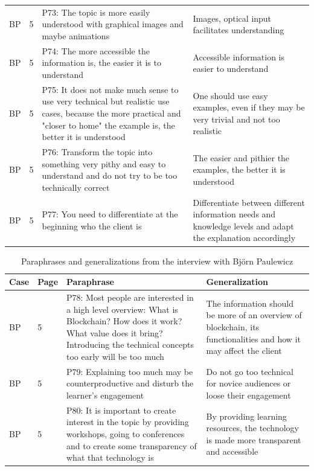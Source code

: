 \begin{table}[H]
\begin{tabularx}{\textwidth}{ll|X|p{4.5cm}}
	BP & 5 & P73: The topic is more easily understood with graphical images and maybe animations & Images, optical input facilitates understanding   \\ 
	BP & 5 & P74: The more accessible the information is, the easier it is to understand & Accessible information is easier to understand   \\ 
	BP & 5 & P75: It does not make much sense to use very technical but realistic use cases, because the more practical and "closer to home" the example is, the better it is understood & One should use easy examples, even if they may be very trivial and not too realistic   \\ 
	BP & 5 & P76: Transform the topic into something very pithy and easy to understand and do not try to be too technically correct & The easier and pithier the examples, the better it is understood   \\ 
	BP & 5 & P77: You need to differentiate at the beginning who the client is & Differentiate between different information needs and knowledge levels and adapt the explanation accordingly   \\ 
	\end{tabularx}
\end{table}

\begin{table}[H]
    \centering
    \begin{tabularx}{\textwidth}{ll|X|p{4.5cm}}
    Case & Page & Paraphrase & Generalization  \\ \hline
	BP & 5 & P78: Most people are interested in a high level overview: What is Blockchain? How does it work? What value does it bring? Introducing the technical concepts too early will be too much & The information should be more of an overview of blockchain, its functionalities and how it may affect the client   \\ 
	BP & 5 & P79: Explaining too much may be counterproductive and disturb the learner's engagement & Do not go too technical for novice audiences or loose their engagement   \\ 
	BP & 5 & P80: It is important to create interest in the topic by providing workshops, going to conferences and to create some transparency of what that technology is & By providing learning resources, the technology is made more transparent and accessible   \\ 
    \end{tabularx}
    \caption{Paraphrases and generalizations from the interview with Björn Paulewicz}
    \label{tab:my_label3}
\end{table}

